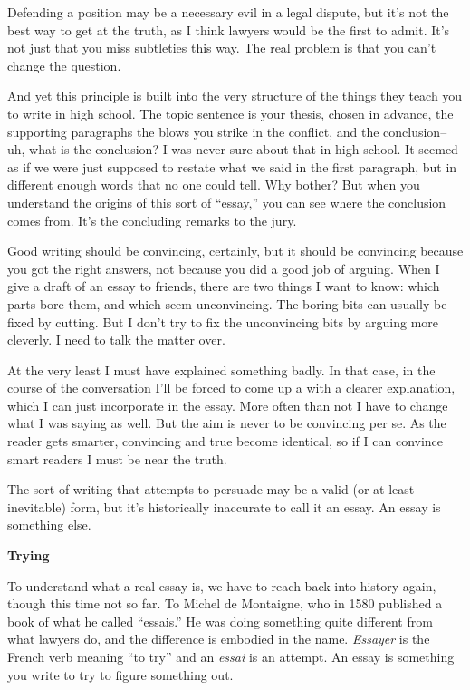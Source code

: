 \documentclass[12pt]{book}
\begin{document}
Defending a position may be a necessary evil in a legal dispute, but
it's not the best way to get at the truth, as I think lawyers would be
the first to admit. It's not just that you miss subtleties this way. The
real problem is that you can't change the question.

And yet this principle is built into the very structure of the things
they teach you to write in high school. The topic sentence is your
thesis, chosen in advance, the supporting paragraphs the blows you
strike in the conflict, and the conclusion-- uh, what is the conclusion?
I was never sure about that in high school. It seemed as if we were just
supposed to restate what we said in the first paragraph, but in
different enough words that no one could tell. Why bother? But when you
understand the origins of this sort of ``essay,'' you can see where the
conclusion comes from. It's the concluding remarks to the jury.

Good writing should be convincing, certainly, but it should be
convincing because you got the right answers, not because you did a good
job of arguing. When I give a draft of an essay to friends, there are
two things I want to know: which parts bore them, and which seem
unconvincing. The boring bits can usually be fixed by cutting. But I
don't try to fix the unconvincing bits by arguing more cleverly. I need
to talk the matter over.

At the very least I must have explained something badly. In that case,
in the course of the conversation I'll be forced to come up a with a
clearer explanation, which I can just incorporate in the essay. More
often than not I have to change what I was saying as well. But the aim
is never to be convincing per se. As the reader gets smarter, convincing
and true become identical, so if I can convince smart readers I must be
near the truth.

The sort of writing that attempts to persuade may be a valid (or at
least inevitable) form, but it's historically inaccurate to call it an
essay. An essay is something else.

\textbf{Trying}

To understand what a real essay is, we have to reach back into history
again, though this time not so far. To Michel de Montaigne, who in 1580
published a book of what he called ``essais.'' He was doing something
quite different from what lawyers do, and the difference is embodied in
the name. \emph{Essayer} is the French verb meaning ``to try'' and an
\emph{essai} is an attempt. An essay is something you write to try to
figure something out.
\end{document}

